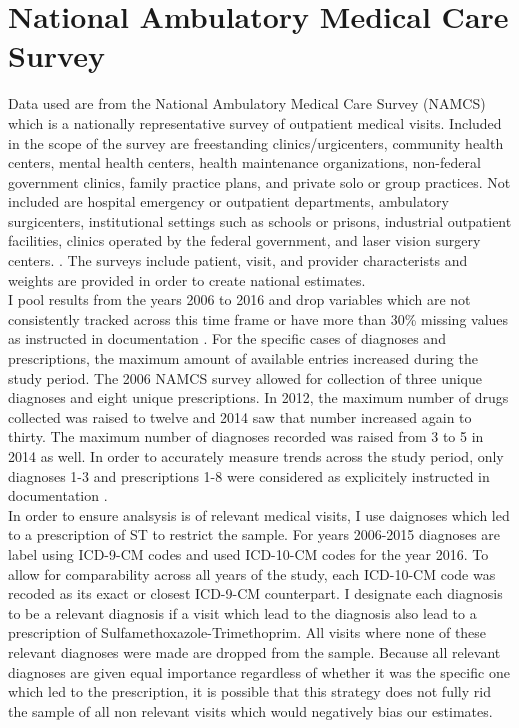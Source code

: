 \chapter{National Ambulatory Medical Care Survey}
Data used are from the National Ambulatory Medical Care Survey (NAMCS) which is a nationally representative survey of outpatient medical visits. Included in the scope of the survey are freestanding clinics/urgicenters, community health centers, mental health centers, health maintenance organizations,  non-federal government clinics, family practice plans, and private solo or group practices. Not included are hospital emergency or outpatient departments, ambulatory surgicenters, institutional settings such as schools or prisons, industrial outpatient facilities, clinics operated by the federal government, and laser vision surgery centers. \cite{hing_basic_nodate}. The surveys include patient, visit, and provider characterists and weights are provided in order to create national estimates.\\
\indent I pool results from the years 2006 to 2016 and drop variables which are not consistently tracked across this time frame or have more than 30\% missing values as instructed in documentation \cite{myrick_understanding_nodate}. For the specific cases of diagnoses and prescriptions, the maximum amount of available entries increased during the study period. The 2006 NAMCS survey allowed for collection of three unique diagnoses and eight unique prescriptions. In 2012, the maximum number of drugs collected was raised to twelve and 2014 saw that number increased again to thirty. The maximum number of diagnoses recorded was raised from 3 to 5 in 2014 as well. In order to accurately measure trends across the study period, only diagnoses 1-3 and prescriptions 1-8 were considered as explicitely instructed in documentation \cite{schappert_analyzing_nodate}.\\
\indent In order to ensure analsysis is of relevant medical visits, I use daignoses which led to a prescription of ST to restrict the sample. For years 2006-2015 diagnoses are label using ICD-9-CM codes and used ICD-10-CM codes for the year 2016. To allow for comparability across all years of the study, each ICD-10-CM code was recoded as its exact or closest ICD-9-CM counterpart. I designate each diagnosis to be a relevant diagnosis if a visit which lead to the diagnosis also lead to a prescription of Sulfamethoxazole-Trimethoprim. All visits where none of these relevant diagnoses were made are dropped from the sample. Because all relevant diagnoses are given equal importance regardless of whether it was the specific one which led to the prescription, it is possible that this strategy does not fully rid the sample of all non relevant visits which would negatively bias our estimates.\\
